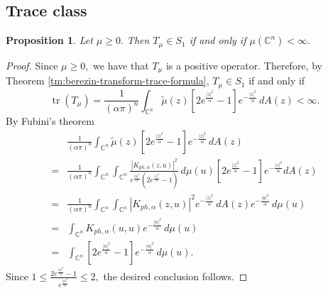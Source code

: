 \documentclass[10pt,leqno]{amsart}
\newtheorem{proposition}[theorem]{Proposition}
\theoremstyle{remark}
\numberwithin{equation}{section}
\newcommand{\Kph}{K_{ph,\alpha}}%
\DeclareMathOperator{\tr}{tr}
\begin{document}
\subsection{Trace class}
\begin{proposition}
	Let \(\mu \geq 0.\) Then $T_\mu \in S_1$ if and only if $\mu(\mathbb{C}^{n})<\infty.$
\end{proposition}
\begin{proof}
	Since $ \mu \geq 0,$ we have that $T_\mu$ is a positive operator. Therefore, by Theorem \ref{tm:berezin-transform-trace-formula},  $T_\mu \in S_1$ if and only if
	\[
		\tr (T_\mu) = \frac{1}{\left( \alpha \pi \right) ^{n}} \int_{\mathbb{C}^{n}}^{}\widetilde{\mu}(z)\left[ 2e^{\frac{|z|^2}{\alpha}}-1 \right] e^{-\frac{|z|^2}{\alpha}}\, dA(z)< \infty.
	\]
	By Fubini's theorem
	\begin{align*}
		  & \frac{1}{\left( \alpha \pi\right) ^{n}}\int_{\mathbb{C}^{n}}^{}\widetilde{\mu}(z)\left[ 2e^{\frac{|z|^2}{\alpha}}-1 \right] e^{-\frac{|z|^2}{\alpha}}\, dA(z)                                                                                                        \\
		= & \frac{1}{\left( \alpha \pi \right) ^{n}}\int_{\mathbb{C}^{n}} \int_{\mathbb{C}^{n}}^{}\frac{|\Kph(z,u)|^2}{e^{\frac{|u|^2}{\alpha}}\left( 2e^{\frac{|z|^2}{\alpha}}-1 \right) }\, d\mu(u) \left[ 2e^{\frac{|z|^2}{\alpha}}-1 \right] e^{-\frac{|z|^2}{\alpha}} dA(z) \\
		= & \frac{1}{\left( \alpha \pi \right) ^{n}}\int_{\mathbb{C}^{n}}^{}\int_{\mathbb{C}^{n}}^{}|\Kph(z,u)|^2 e^{-\frac{|z|^2}{\alpha}}\, dA(z)e^{-\frac{|u|^2}{\alpha}} \, d\mu(u)                                                                                          \\
		= & \int_{\mathbb{C}^{n}}^{}\Kph(u,u) e^{-\frac{|u|^2}{\alpha}}\, d\mu(u)                                                                                                                                                                                                \\
		= & \int_{\mathbb{C}^{n}}^{}\left[ 2e^{\frac{|u|^2}{\alpha}}-1 \right] e^{-\frac{|u|^2}{\alpha}}\, d\mu(u).
	\end{align*}
	Since $1 \leq \frac{2e^{\frac{|u|^2}{\alpha}}-1}{e^{\frac{|u|^2}{\alpha}}}\leq 2,$ the desired conclusion follows.
\end{proof}
\end{document}
